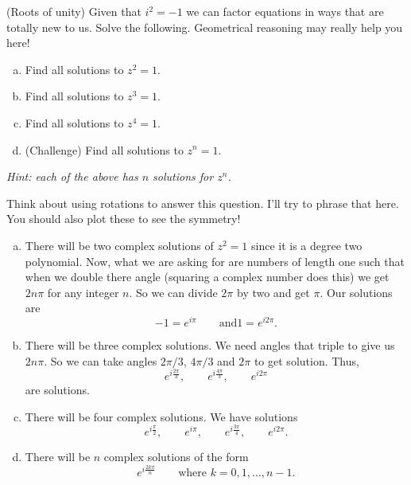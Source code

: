 \documentclass[12pt]{article} %
\begin{document}
\newpage

\begin{problem}
(Roots of unity) Given that $i^2=-1$ we can factor equations in ways that are totally new to us.  Solve the following. Geometrical reasoning may really help you here!
\begin{enumerate}[(a)]
    \item Find all solutions to $z^2=1$.
    \item Find all solutions to $z^3=1$.
    \item Find all solutions to $z^4=1$.
    \item (Challenge) Find all solutions to $z^n=1$.
\end{enumerate}
\emph{Hint: each of the above has $n$ solutions for $z^n$.}
\end{problem}
\begin{solution}
Think about using rotations to answer this question.  I'll try to phrase that here. You should also plot these to see the symmetry!
\begin{enumerate}[(a)]
    \item There will be two complex solutions of $z^2=1$ since it is a degree two polynomial.  Now, what we are asking for are numbers of length one such that when we double there angle (squaring a complex number does this) we get $2n\pi$ for any integer $n$.  So we can divide $2\pi$ by two and get $\pi$. Our solutions are
    \[
    -1=e^{i\pi} \qquad \textrm{and} 1=e^{i2\pi}.
    \]
    \item There will be three complex solutions. We need angles that triple to give us $2n\pi$.  So we can take angles $2\pi/3$, $4\pi/3$ and $2\pi$ to get solution. Thus,
    \[
    e^{i\frac{2\pi}{3}}, \qquad e^{i\frac{4\pi}{3}}, \qquad e^{i2\pi}
    \]
    are solutions.
    \item There will be four complex solutions. We have solutions
    \[
    e^{i\frac{\pi}{2}}, \qquad e^{i\pi}, \qquad e^{i\frac{3\pi}{4}}, \qquad e^{i2\pi}.
    \]
    \item There will be $n$ complex solutions of the form
    \[
    e^{i\frac{2k\pi}{n}} \qquad \textrm{where $k=0,1,\dots,n-1$}.
    \]
\end{enumerate}
\end{solution}

\newpage
\end{document}
